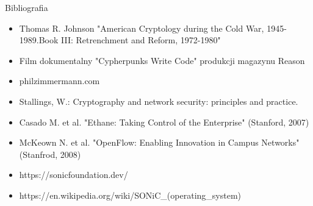 \documentclass[aspectratio=169]{beamer}
\begin{document}
\begin{frame}{Bibliografia}
    \begin{itemize}
        \item Thomas R. Johnson "American Cryptology during the Cold War, 1945-1989.Book III: Retrenchment and Reform, 1972-1980"
        \item Film dokumentalny "Cypherpunks Write Code" produkcji magazynu Reason
        \item philzimmermann.com
        \item Stallings, W.: Cryptography and network security: principles and practice.
        \item Casado M. et al. "Ethane: Taking Control of the Enterprise" (Stanford, 2007)
        \item McKeown N. et al. "OpenFlow: Enabling Innovation in Campus Networks" (Stanfrod, 2008)
        \item https://sonicfoundation.dev/
        \item https://en.wikipedia.org/wiki/SONiC\_(operating\_system)
    \end{itemize}
\end{frame}

\pglastframe

\end{document}
